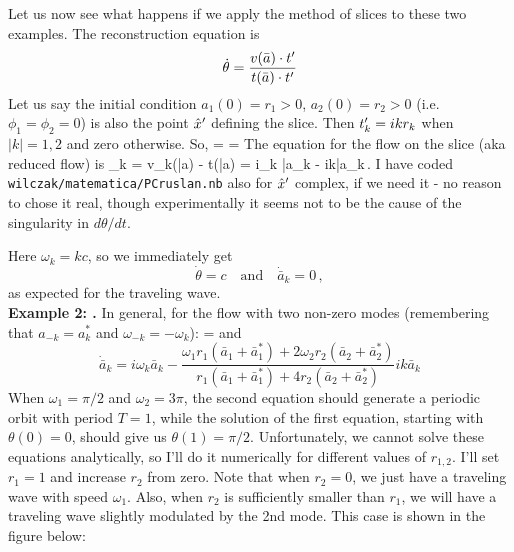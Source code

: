 Let us now see what happens if we apply the method of slices to these two examples.
The reconstruction equation is
\[ \dot{\theta} = \frac{v(\bar{a}) \cdot t'_{}}{t(\bar{a}) \cdot t'_{}} \]
Let us say the initial condition $a_1(0) = r_1 > 0$, $a_2(0) = r_2 > 0$
(i.e. $\phi_1 = \phi_2 = 0$) is also the point ${\hat{x}'}$ defining the slice.  Then
$t'_{k} = ikr_k$ when $|k| = 1,2$ and zero otherwise.  So,
\beq
\dot{\theta} = 
                = 
The equation for the flow on the slice (aka reduced flow) is
\beq
{}_k = v_k(\bar{a}) -  t(\bar{a})
                   = i\omega_k \bar{a}_k -  ik\bar{a}_k\,.
\medskip{}
I have coded \texttt{wilczak/matematica/PCruslan.nb} also for
$\slicep$ complex, if we need it - no reason to chose it real,
though experimentally it seems not to be the cause of the singularity in
$d\theta/dt$.

 Here $\omega_k = kc$, so we immediately get
\[ \dot{\theta} = c \quad \mathrm{and} \quad \dot{\bar{a}}_k = 0\,, \]
as expected for the traveling wave.\\
{\bf Example 2:  \Rpo.} In general, for the flow with two non-zero
modes (remembering that $a_{-k} = a_k^*$ and $\omega_{-k} =
-\omega_k$):
\beq
 \dot{\theta} = 
and
\[ \dot{\bar{a}}_k = i\omega_k \bar{a}_k - \frac{\omega_1 r_1 (\bar{a}_1 + \bar{a}_1^*) + 2\omega_2 r_2 (\bar{a}_2 + \bar{a}_2^*)}{r_1(\bar{a}_1 + \bar{a}_1^*) + 4r_2 (\bar{a}_2 + \bar{a}_2^*)}ik\bar{a}_k \]
When $\omega_1 = \pi/2$ and $\omega_2 = 3\pi$, the second equation should generate a periodic orbit with period $T = 1$, while the solution of the first equation, starting with $\theta(0) = 0$, should give us $\theta(1) = \pi/2$.  Unfortunately, we cannot solve these equations analytically, so I'll do it numerically for different values of $r_{1,2}$.  I'll set $r_1 = 1$ and increase $r_2$ from zero.  Note that when $r_2 = 0$, we just have a traveling wave with speed $\omega_1$.  Also, when $r_2$ is sufficiently smaller than $r_1$, we will have a traveling wave slightly modulated by the 2nd mode.  This case is shown in the figure below:

